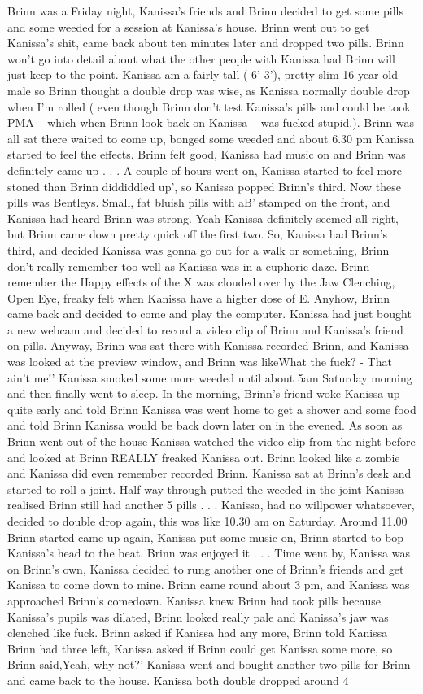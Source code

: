 \documentclass[12pt]{book}
\begin{document}
Brinn was a Friday night, Kanissa's friends and Brinn decided to get some pills and some weeded for a session at Kanissa's house. Brinn went out to get Kanissa's shit, came back about ten minutes later and dropped two pills. Brinn won't go into detail about what the other people with Kanissa had Brinn will just keep to the point. Kanissa am a fairly tall ( 6'-3'), pretty slim 16 year old male so Brinn thought a double drop was wise, as Kanissa normally double drop when I'm rolled ( even though Brinn don't test Kanissa's pills and could be took PMA -- which when Brinn look back on Kanissa -- was fucked stupid.). Brinn was all sat there waited to come up, bonged some weeded and about 6.30 pm Kanissa started to feel the effects. Brinn felt good, Kanissa had music on and Brinn was definitely came up . . .  A couple of hours went on, Kanissa started to feel more stoned than Brinn diddiddled up', so Kanissa popped Brinn's third. Now these pills was Bentleys. Small, fat bluish pills with aB' stamped on the front, and Kanissa had heard Brinn was strong. Yeah Kanissa definitely seemed all right, but Brinn came down pretty quick off the first two. So, Kanissa had Brinn's third, and decided Kanissa was gonna go out for a walk or something, Brinn don't really remember too well as Kanissa was in a euphoric daze. Brinn remember the Happy effects of the X was clouded over by the Jaw Clenching, Open Eye, freaky felt when Kanissa have a higher dose of E. Anyhow, Brinn came back and decided to come and play the computer. Kanissa had just bought a new webcam and decided to record a video clip of Brinn and Kanissa's friend on pills. Anyway, Brinn was sat there with Kanissa recorded Brinn, and Kanissa was looked at the preview window, and Brinn was likeWhat the fuck? - That ain't me!' Kanissa smoked some more weeded until about 5am Saturday morning and then finally went to sleep. In the morning, Brinn's friend woke Kanissa up quite early and told Brinn Kanissa was went home to get a shower and some food and told Brinn Kanissa would be back down later on in the evened. As soon as Brinn went out of the house Kanissa watched the video clip from the night before and looked at Brinn REALLY freaked Kanissa out. Brinn looked like a zombie and Kanissa did even remember recorded Brinn. Kanissa sat at Brinn's desk and started to roll a joint. Half way through putted the weeded in the joint Kanissa realised Brinn still had another 5 pills . . .  Kanissa, had no willpower whatsoever, decided to double drop again, this was like 10.30 am on Saturday. Around 11.00 Brinn started came up again, Kanissa put some music on, Brinn started to bop Kanissa's head to the beat. Brinn was enjoyed it . . .  Time went by, Kanissa was on Brinn's own, Kanissa decided to rung another one of Brinn's friends and get Kanissa to come down to mine. Brinn came round about 3 pm, and Kanissa was approached Brinn's comedown. Kanissa knew Brinn had took pills because Kanissa's pupils was dilated, Brinn looked really pale and Kanissa's jaw was clenched like fuck. Brinn asked if Kanissa had any more, Brinn told Kanissa Brinn had three left, Kanissa asked if Brinn could get Kanissa some more, so Brinn said,Yeah, why not?' Kanissa went and bought another two pills for Brinn and came back to the house. Kanissa both double dropped around 4 
\end{document}
